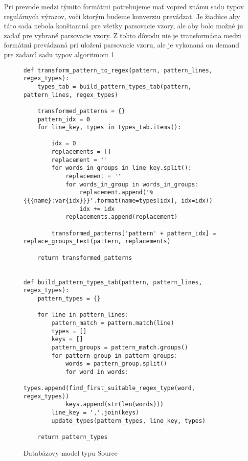 Pri prevode medzi týmito formátmi potrebujeme mať vopred známu sadu typov regulárnych výrazov, voči ktorým budeme konverziu prevádzať. Je žiadúce aby táto sada nebola konštantná pre všetky parsovacie vzory, ale aby bolo možné ju zadať pre vybrané parsovacie vzory. Z tohto dôvodu nie je transformácia medzi formátmi prevádzaná pri uložení parsovacie vzoru, ale je vykonaná on demand pre zadanú sadu typov algoritmom \ref{fig:pattern-transformation}

\begin{figure}[htbp]
\centering
\begin{minipage}{0.9\textwidth}
\lstset{tabsize=4,columns=flexible,breaklines=true,breakatwhitespace=true, showstringspaces=false}
\begin{lstlisting}
def transform_pattern_to_regex(pattern, pattern_lines, regex_types):
    types_tab = build_pattern_types_tab(pattern, pattern_lines, regex_types)

    transformed_patterns = {}
    pattern_idx = 0
    for line_key, types in types_tab.items():

        idx = 0
        replacements = []
        replacement = ''
        for words_in_groups in line_key.split():
            replacement = ''
            for words_in_group in words_in_groups:
                replacement.append('%{{{name}:var{idx}}}'.format(name=types[idx], idx=idx))
                idx += idx
            replacements.append(replacement)
            
        transformed_patterns['pattern' + pattern_idx] = replace_groups_text(pattern, replacements)

    return transformed_patterns


def build_pattern_types_tab(pattern, pattern_lines, regex_types):
    pattern_types = {}

    for line in pattern_lines:
        pattern_match = pattern.match(line)
        types = []
        keys = []
        pattern_groups = pattern_match.groups()
        for pattern_group in pattern_groups:
            words = pattern_group.split()
            for word in words:
                types.append(find_first_suitable_regex_type(word, regex_types))
            keys.append(str(len(words)))
        line_key = ','.join(keys)
        update_types(pattern_types, line_key, types)

    return pattern_types
\end{lstlisting} 		
\end{minipage} 
\caption{Databázovy model typu Source}
\label{fig:pattern-transformation}
\end{figure}

